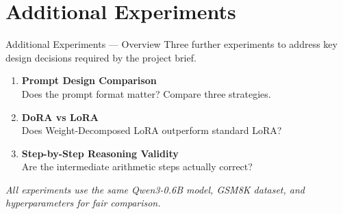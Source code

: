 \documentclass[aspectratio=169,10pt]{beamer}
\begin{document}
\section{Additional Experiments}

\begin{frame}{Additional Experiments — Overview}
  Three further experiments to address key design decisions
  required by the project brief.

  \vspace{1em}
  \begin{enumerate}
    \item \textbf{Prompt Design Comparison}\\
          Does the prompt format matter? Compare three strategies.
    \item \textbf{DoRA vs LoRA}\\
          Does Weight-Decomposed LoRA outperform standard LoRA?
    \item \textbf{Step-by-Step Reasoning Validity}\\
          Are the intermediate arithmetic steps actually correct?
  \end{enumerate}

  \vspace{1em}
  \begin{center}\small
    \textit{All experiments use the same Qwen3-0.6B model, GSM8K dataset,
    and hyperparameters for fair comparison.}
  \end{center}
\end{frame}
\end{document}
